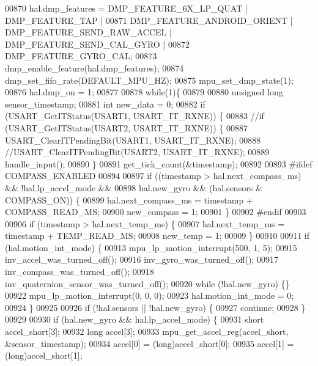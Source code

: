 \begin{DoxyCode}
00870     hal.dmp_features = DMP\_FEATURE\_6X\_LP\_QUAT | DMP\_FEATURE\_TAP |
00871         DMP\_FEATURE\_ANDROID\_ORIENT | DMP\_FEATURE\_SEND\_RAW\_ACCEL | DMP\_FEATURE\_SEND\_CAL\_GYRO |
00872         DMP\_FEATURE\_GYRO\_CAL;
00873     dmp\_enable\_feature(hal.dmp_features);
00874     dmp\_set\_fifo\_rate(DEFAULT_MPU_HZ);
00875     mpu\_set\_dmp\_state(1);
00876     hal.dmp_on = 1;
00877 
00878   \textcolor{keywordflow}{while}(1)\{
00879     
00880     \textcolor{keywordtype}{unsigned} \textcolor{keywordtype}{long} sensor\_timestamp;
00881     \textcolor{keywordtype}{int} new\_data = 0;
00882     \textcolor{keywordflow}{if} (USART_GetITStatus(USART1, USART_IT_RXNE)) \{
00883     \textcolor{comment}{//if (USART\_GetITStatus(USART2, USART\_IT\_RXNE)) \{}
00887 \textcolor{comment}{}        USART_ClearITPendingBit(USART1, USART_IT_RXNE);
00888         \textcolor{comment}{//USART\_ClearITPendingBit(USART2, USART\_IT\_RXNE);}
00889         handle_input();
00890     \}
00891     get_tick_count(&timestamp);
00892 
00893 \textcolor{preprocessor}{#ifdef COMPASS\_ENABLED}
00894 
00897         \textcolor{keywordflow}{if} ((timestamp > hal.next_compass_ms) && !hal.lp_accel_mode &&
00898             hal.new_gyro && (hal.sensors & COMPASS_ON)) \{
00899             hal.next_compass_ms = timestamp + COMPASS_READ_MS;
00900             new\_compass = 1;
00901         \}
00902 \textcolor{preprocessor}{#endif}
00903 
00906         \textcolor{keywordflow}{if} (timestamp > hal.next_temp_ms) \{
00907             hal.next_temp_ms = timestamp + TEMP_READ_MS;
00908             new\_temp = 1;
00909         \}
00910 
00911     \textcolor{keywordflow}{if} (hal.motion_int_mode) \{
00913         mpu\_lp\_motion\_interrupt(500, 1, 5);
00915         inv\_accel\_was\_turned\_off();
00916         inv\_gyro\_was\_turned\_off();
00917         inv\_compass\_was\_turned\_off();
00918         inv\_quaternion\_sensor\_was\_turned\_off();
00920         \textcolor{keywordflow}{while} (!hal.new_gyro) \{\}
00922         mpu\_lp\_motion\_interrupt(0, 0, 0);
00923         hal.motion_int_mode = 0;
00924     \}
00925 
00926     \textcolor{keywordflow}{if} (!hal.sensors || !hal.new_gyro) \{
00927         \textcolor{keywordflow}{continue};
00928     \}    
00929 
00930         \textcolor{keywordflow}{if} (hal.new_gyro && hal.lp_accel_mode) \{
00931             \textcolor{keywordtype}{short} accel\_short[3];
00932             \textcolor{keywordtype}{long} accel[3];
00933             mpu\_get\_accel\_reg(accel\_short, &sensor\_timestamp);
00934             accel[0] = (long)accel\_short[0];
00935             accel[1] = (long)accel\_short[1];

\end{DoxyCode}
